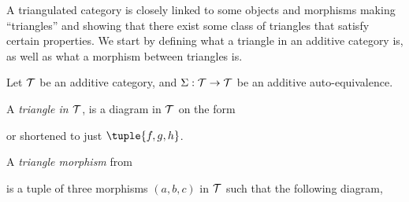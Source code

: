 A triangulated category is closely linked to some objects and morphisms making ``triangles'' and showing that there exist some class of triangles that satisfy certain properties. We start by defining what a triangle in an additive category is, as well as what a morphism between triangles is.

\begin{definition}[Triangles]
    \label{def:triangles}
    Let \( {\mathcal{T}} \) be an additive category, and \( \Sigma: {\mathcal{T}} \to {\mathcal{T}} \) be an additive auto-equivalence.

    A \emph{triangle in \( {\mathcal{T}} \)}, is a diagram in \( {\mathcal{T}} \) on the form
    \begin{center}
    \end{center}
    or shortened to just \( \tuple{f, g, h} \).

    A \emph{triangle morphism} from
    \begin{center}
    \end{center}
    is a tuple of three morphisms \( (a, b, c) \) in \( {\mathcal{T}} \) such that the following diagram,
    \begin{center}
\end{center}
\end{definition}
